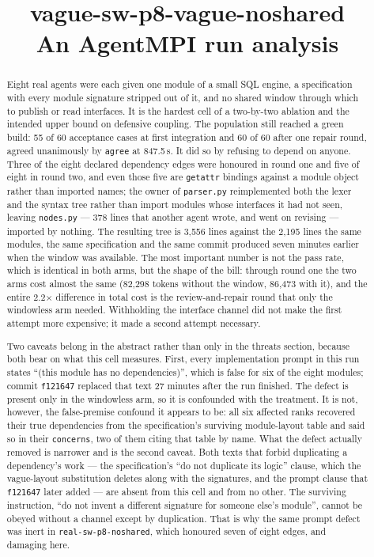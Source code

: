\documentclass[11pt]{article}
\title{\textbf{vague-sw-p8-vague-noshared}\\[2pt]\large An AgentMPI run analysis}
\author{}
\date{}
\begin{document}
\maketitle

\begin{abstract}
Eight real agents were each given one module of a small SQL engine, a specification with
every module signature stripped out of it, and no shared window through which to publish or
read interfaces. It is the hardest cell of a two-by-two ablation and the intended upper bound
on defensive coupling. The population still reached a green build: 55 of 60 acceptance cases
at first integration and 60 of 60 after one repair round, agreed unanimously by \texttt{agree}
at 847.5\,s. It did so by refusing to depend on anyone. Three of the eight declared dependency
edges were honoured in round one and five of eight in round two, and even those five are
\texttt{getattr} bindings against a module object rather than imported names; the owner of
\texttt{parser.py} reimplemented both the lexer and the syntax tree rather than import modules
whose interfaces it had not seen, leaving \texttt{nodes.py} --- 378 lines that another agent
wrote, and went on revising --- imported by nothing. The resulting tree is 3,556 lines against
the 2,195 lines the same modules, the same specification and the same commit produced seven
minutes earlier when the window was available. The most important number is not the pass rate,
which is identical in both arms, but the shape of the bill: through round one the two arms
cost almost the same (82,298 tokens without the window, 86,473 with it), and the entire
2.2$\times$ difference in total cost is the review-and-repair round that only the windowless
arm needed. Withholding the interface channel did not make the first attempt more expensive;
it made a second attempt necessary.

Two caveats belong in the abstract rather than only in the threats section, because both bear
on what this cell measures. First, every implementation prompt in this run states ``(this
module has no dependencies)'', which is false for six of the eight modules; commit
\texttt{f121647} replaced that text 27 minutes after the run finished. The defect is present
only in the windowless arm, so it is confounded with the treatment. It is not, however, the
false-premise confound it appears to be: all six affected ranks recovered their true
dependencies from the specification's surviving module-layout table and said so in their
\texttt{concerns}, two of them citing that table by name. What the defect actually removed is
narrower and is the second caveat. Both texts that forbid duplicating a dependency's work ---
the specification's ``do not duplicate its logic'' clause, which the vague-layout substitution
deletes along with the signatures, and the prompt clause that \texttt{f121647} later added ---
are absent from this cell and from no other. The surviving instruction, ``do not invent a
different signature for someone else's module'', cannot be obeyed without a channel except by
duplication. That is why the same prompt defect was inert in \texttt{real-sw-p8-noshared},
which honoured seven of eight edges, and damaging here.
\end{abstract}
\end{document}
